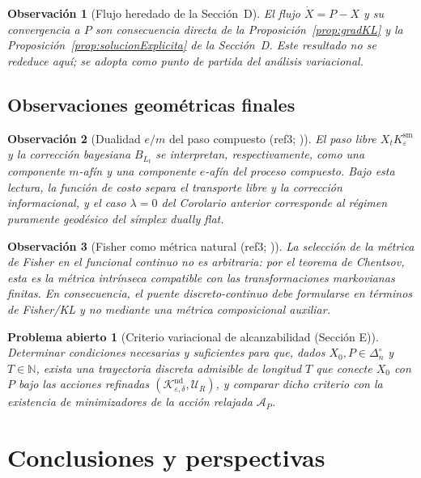 ﻿\documentclass[12pt]{article}
\newcommand{\fuente}[1]{\textnormal{(#1)}}
\newcommand{\fuentecite}[2]{\textnormal{(#1; \citealp{#2})}}
\newtheorem{observacion}{Observación}[section]
\newtheorem{problema}{Problema abierto}[section]
\begin{document}
\begin{observacion}[Flujo heredado de la Sección~D]
El flujo \(\dot X = P - X\) y su convergencia a \(P\) son consecuencia directa de la Proposición~\ref{prop:gradKL} y la Proposición~\ref{prop:solucionExplicita} de la Sección~D. Este resultado no se rededuce aquí; se adopta como punto de partida del análisis variacional.
\end{observacion}

\subsection{Observaciones geométricas finales}

\begin{observacion}[Dualidad \(e/m\) del paso compuesto \fuentecite{ref3}{Amari2016}]
El paso libre \(X_tK_\varepsilon^{\mathrm{sm}}\) y la corrección bayesiana \(B_{L_t}\) se interpretan, respectivamente, como una componente \(m\)-afín y una componente \(e\)-afín del proceso compuesto. Bajo esta lectura, la función de costo separa el transporte libre y la corrección informacional, y el caso \(\lambda=0\) del Corolario anterior corresponde al régimen puramente geodésico del símplex dually flat.
\end{observacion}

\begin{observacion}[Fisher como métrica natural \fuentecite{ref3}{Amari2016,Chentsov1982}]
La selección de la métrica de Fisher en el funcional continuo no es arbitraria: por el teorema de Chentsov, esta es la métrica intrínseca compatible con las transformaciones markovianas finitas. En consecuencia, el puente discreto-continuo debe formularse en términos de Fisher/KL y no mediante una métrica composicional auxiliar.
\end{observacion}

\begin{problema}[Criterio variacional de alcanzabilidad \fuente{Sección E}]
Determinar condiciones necesarias y suficientes para que, dados \(X_0,P\in \Delta_n^\circ\) y \(T\in\mathbb N\), exista una trayectoria discreta admisible de longitud \(T\) que conecte \(X_0\) con \(P\) bajo las acciones refinadas \((\mathcal K_{\varepsilon,\delta}^{\mathrm{nd}},\mathcal U_R)\), y comparar dicho criterio con la existencia de minimizadores de la acción relajada \(\mathcal A_P\).
\end{problema}


\section{Conclusiones y perspectivas}
\end{document}
